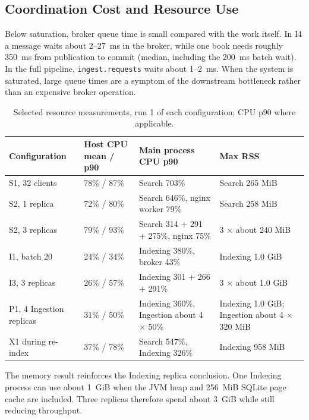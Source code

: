 \documentclass[12pt,a4paper]{article}
\begin{document}
\subsection{Coordination Cost and Resource Use}

Below saturation, broker queue time is small compared with the work itself. In I4 a message waits
about 2--27~ms in the broker, while one book needs roughly 350~ms from publication to commit
(median, including the 200~ms batch wait). In the full
pipeline, \texttt{ingest.requests} waits about 1--2~ms. When the system is saturated, large queue
times are a symptom of the downstream bottleneck rather than an expensive broker operation.

\begin{table}[H]
    \centering
    \caption{Selected resource measurements, run 1 of each configuration; CPU p90 where applicable.}
    \label{tab:resources}
    \scriptsize
    \begin{tabularx}{\textwidth}{p{} p{} X p{}}
        \toprule
        \textbf{Configuration} & \textbf{Host CPU mean / p90} & \textbf{Main process CPU p90} & \textbf{Max RSS} \\
        \midrule
        S1, 32 clients & 78\% / 87\% & Search 703\% & Search 265 MiB \\
        S2, 1 replica & 72\% / 80\% & Search 646\%, nginx worker 79\% & Search 258 MiB \\
        S2, 3 replicas & 79\% / 93\% & Search 314 + 291 + 275\%, nginx 75\% & 3 $\times$ about 240 MiB \\
        I1, batch 20 & 24\% / 34\% & Indexing 380\%, broker 43\% & Indexing 1.0 GiB \\
        I3, 3 replicas & 26\% / 57\% & Indexing 301 + 266 + 291\% & 3 $\times$ about 1.0 GiB \\
        P1, 4 Ingestion replicas & 31\% / 50\% & Indexing 360\%, Ingestion about 4 $\times$ 50\% & Indexing 1.0 GiB; Ingestion about 4 $\times$ 320 MiB \\
        X1 during re-index & 37\% / 78\% & Search 547\%, Indexing 326\% & Indexing 958 MiB \\
        \bottomrule
    \end{tabularx}
\end{table}

The memory result reinforces the Indexing replica conclusion. One Indexing process can use about
1~GiB when the JVM heap and 256~MiB SQLite page cache are included. Three replicas therefore spend
about 3~GiB while still reducing throughput.
\end{document}
